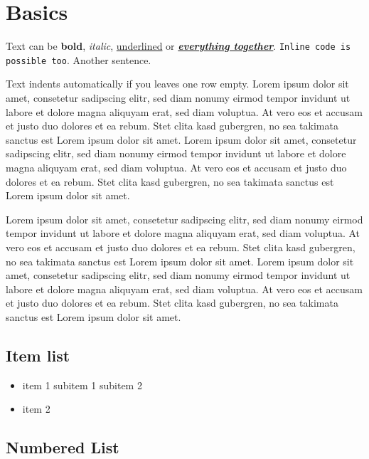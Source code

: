 
\chapter{Basics}

Text can be \textbf{bold}, \textit{italic}, \underline{underlined} or \textbf{\textit{\underline{everything together}}}. \texttt{Inline code is possible too}. Another sentence.

Text indents automatically if you leaves one row empty. Lorem ipsum dolor sit amet, consetetur sadipscing elitr, sed diam nonumy eirmod tempor invidunt ut labore et dolore magna aliquyam erat, sed diam voluptua. At vero eos et accusam et justo duo dolores et ea rebum. Stet clita kasd gubergren, no sea takimata sanctus est Lorem ipsum dolor sit amet. Lorem ipsum dolor sit amet, consetetur sadipscing elitr, sed diam nonumy eirmod tempor invidunt ut labore et dolore magna aliquyam erat, sed diam voluptua. At vero eos et accusam et justo duo dolores et ea rebum. Stet clita kasd gubergren, no sea takimata sanctus est Lorem ipsum dolor sit amet. \cite{Albrecht2010}

Lorem ipsum dolor sit amet, consetetur sadipscing elitr, sed diam nonumy eirmod tempor invidunt ut labore et dolore magna aliquyam erat, sed diam voluptua. At vero eos et accusam et justo duo dolores et ea rebum. Stet clita kasd gubergren, no sea takimata sanctus est Lorem ipsum dolor sit amet. Lorem ipsum dolor sit amet, consetetur sadipscing elitr, sed diam nonumy eirmod tempor invidunt ut labore et dolore magna aliquyam erat, sed diam voluptua. At vero eos et accusam et justo duo dolores et ea rebum. Stet clita kasd gubergren, no sea takimata sanctus est Lorem ipsum dolor sit amet. \cite{hdl_routing} \cite{light_leakage_color}

\section{Item list}

\begin{itemize}
	\item item 1
	\subitem subitem 1
	\subitem subitem 2
	\item item 2
\end{itemize}

\section{Numbered List}


